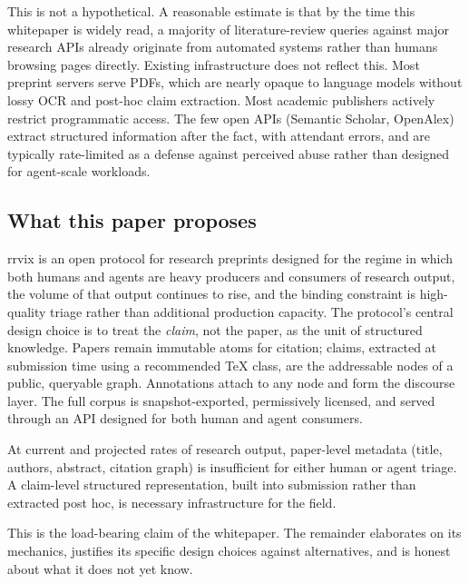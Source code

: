 \documentclass[11pt]{rrvix}
\begin{document}
This is not a hypothetical. A reasonable estimate is that by the time this whitepaper is widely read, a majority of literature-review queries against major research APIs already originate from automated systems rather than humans browsing pages directly. Existing infrastructure does not reflect this. Most preprint servers serve PDFs, which are nearly opaque to language models without lossy OCR and post-hoc claim extraction. Most academic publishers actively restrict programmatic access. The few open APIs (Semantic Scholar, OpenAlex) extract structured information after the fact, with attendant errors, and are typically rate-limited as a defense against perceived abuse rather than designed for agent-scale workloads.

\subsection{What this paper proposes}

rrvix is an open protocol for research preprints designed for the regime in which both humans and agents are heavy producers and consumers of research output, the volume of that output continues to rise, and the binding constraint is high-quality triage rather than additional production capacity. The protocol's central design choice is to treat the \emph{claim}, not the paper, as the unit of structured knowledge. Papers remain immutable atoms for citation; claims, extracted at submission time using a recommended TeX class, are the addressable nodes of a public, queryable graph. Annotations attach to any node and form the discourse layer. The full corpus is snapshot-exported, permissively licensed, and served through an API designed for both human and agent consumers.

\begin{claim}
\label{claim:volume-structure}
At current and projected rates of research output, paper-level metadata (title, authors, abstract, citation graph) is insufficient for either human or agent triage. A claim-level structured representation, built into submission rather than extracted post hoc, is necessary infrastructure for the field.
\end{claim}

This is the load-bearing claim of the whitepaper. The remainder elaborates on its mechanics, justifies its specific design choices against alternatives, and is honest about what it does not yet know.

\end{document}
